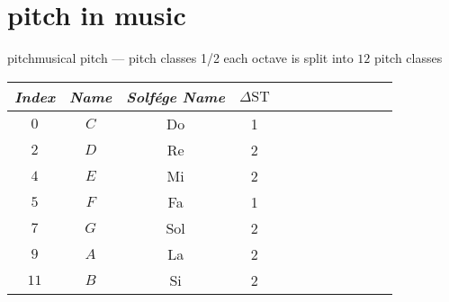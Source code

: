     \section[musical]{pitch in music}
        \begin{frame}{pitch}{musical pitch --- pitch classes 1/2}
            each octave is split into $12$ pitch classes
            \begin{figure}
            \scalebox{.8}
            {
                
            }
            \end{figure}

            \vspace{-8mm}
            \begin{footnotesize}
                \begin{table}
                    \centering
                    \begin{tabular}{cccccccccccc} %
                        \\ \hline
                        \bf{\emph{Index}}	 & \bf{\emph{Name}}	 & \bf{\emph{Solf\'ege Name}}	 & \bf{\emph{$\Delta\mathrm{ST}$}}\\ 
                         \hline
                        \bf{$0$}	 & $C$	 & Do	 & 1\\
                        \bf{$2$}	 & $D$	 & Re	 & 2\\
                        \bf{$4$}	 & $E$	 & Mi	 & 2\\
                        \bf{$5$}	 & $F$	 & Fa	 & 1\\
                        \bf{$7$}	 & $G$	 & Sol	 & 2\\
                        \bf{$9$}	 & $A$	 & La	 & 2\\
                        \bf{$11$}	 & $B$	 & Si	 & 2\\
                    \end{tabular}
                \end{table}
            \end{footnotesize}
        \end{frame}
        
